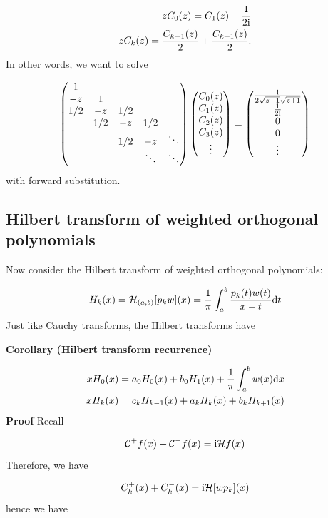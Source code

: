 \documentclass[12pt,a4paper]{article}
\def\D{ {\rm d} }
\def\I{ {\rm i} }
\def\C{ {\mathbb C} }
\def\CC{ {\cal C} }
\def\HH{ {\cal H} }
\def\dx{\D x}
\def\dt{\D t}
\begin{document}
\begin{align*}
z C_0(z) = C_1(z) -  {1  \over 2 \I} \\
z C_k(z) = {C_{k-1}(z) \over 2} +{C_{k+1}(z) \over 2} .
\end{align*}
In other words, we want to solve

\[
\begin{pmatrix}
1 \\
-z & 1 \\
1/2 & -z & 1/2 \\
&1/2 & -z & 1/2 \\
&& 1/2 & -z &\ddots\\
&&&\ddots & \ddots
\end{pmatrix}\begin{pmatrix}C_0(z) \\C_1(z) \\C_2(z) \\C_3(z) \\ \vdots \end{pmatrix} = \begin{pmatrix} { \I \over 2\sqrt{z-1}\sqrt{z+1}} \\{1 \over 2 \I} \\0 \\0 \\ \vdots \end{pmatrix} 
\]
with forward substitution.

\subsection{Hilbert transform of weighted orthogonal polynomials}
Now consider the Hilbert transform of weighted orthogonal polynomials:

\[
H_k(x) = \HH_{(a,b)}[p_k w](x) = {1 \over \pi} \int_a^b {p_k(t) w(t) \over x-t} \dt
\]
Just like Cauchy transforms, the Hilbert transforms have 

\textbf{Corollary (Hilbert transform recurrence)}


\begin{align*}
x H_0(x) &=  a_0 H_0(x) + b_0 H_1(x) + {1 \over \pi} \int_a^b w(x) \dx\\
x H_k(x) &=  c_k H_{k-1}(x) + a_k H_k(x) + b_k H_{k+1}(x) 
\end{align*}
\textbf{Proof} Recall

\[
\CC^+ f(x) + \CC^- f(x) = \I \HH f(x)
\]
Therefore, we have

\[
C_k^+(x) + C_k^-(x) = \I \HH[w p_k](x)
\]
hence we have
\end{document}
